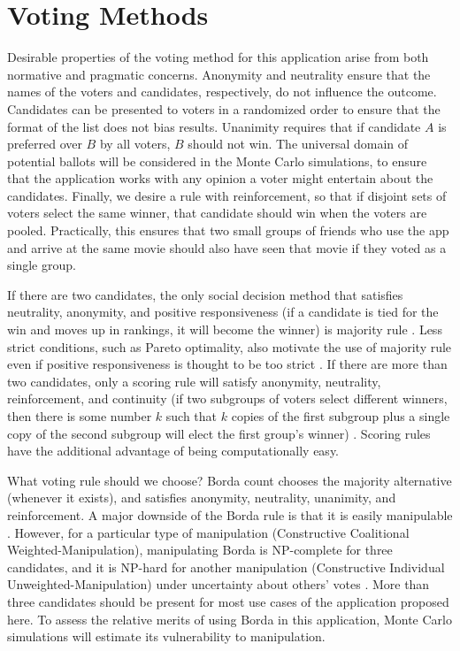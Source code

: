 \documentclass{article}
\begin{document}
\section{Voting Methods}


Desirable properties of the voting method for this application arise from both normative and pragmatic concerns. Anonymity and neutrality ensure that the names of the voters and candidates, respectively, do not influence the outcome. Candidates can be presented to voters in a randomized order to ensure that the format of the list does not bias results. Unanimity requires that if candidate $A$ is preferred over $B$ by all voters, $B$ should not win. The universal domain of potential ballots will be considered in the Monte Carlo simulations, to ensure that the application works with any opinion a voter might entertain about the candidates. Finally, we desire a rule with reinforcement, so that if disjoint sets of voters select the same winner, that candidate should win when the voters are pooled. Practically, this ensures that two small groups of friends who use the app and arrive at the same movie should also have seen that movie if they voted as a single group.

If there are two candidates, the only social decision method that satisfies neutrality, anonymity, and positive responsiveness (if a candidate is tied for the win and moves up in rankings, it will become the winner) is majority rule \citep{may1952}. Less strict conditions, such as Pareto optimality, also motivate the use of majority rule even if positive responsiveness is thought to be too strict \citep{acsan2002,j2003majority}. If there are more than two candidates, only a scoring rule will satisfy anonymity, neutrality, reinforcement, and continuity (if two subgroups of voters select different winners, then there is some number $k$ such that $k$ copies of the first subgroup plus a single copy of the second subgroup will elect the first group's winner) \citep{young1975}. Scoring rules have the additional advantage of being computationally easy.

What voting rule should we choose? Borda count chooses the majority alternative (whenever it exists), and satisfies anonymity, neutrality, unanimity, and reinforcement. A major downside of the Borda rule is that it is easily manipulable \citep{bartholdi1989computational}. However, for a particular type of manipulation (Constructive Coalitional Weighted-Manipulation), manipulating Borda is NP-complete for three candidates, and it is NP-hard for another manipulation (Constructive Individual Unweighted-Manipulation) under uncertainty about others' votes \citep{conitzer2007elections}. More than three candidates should be present for most use cases of the application proposed here. To assess the relative merits of using Borda in this application, Monte Carlo simulations will estimate its vulnerability to manipulation.
\end{document}
